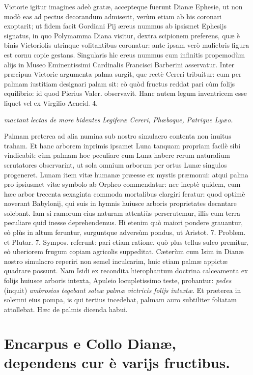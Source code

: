 \documentclass[a4paper, 11pt, oneside, polutonikogreek, latin]{article}
\begin{document}
Victorie igitur imagines adeò gratæ, accepteque fuerunt Dianæ Ephesie, ut non modò eas ad pectus decorandum admiserit, verùm etiam ab his
coronari exoptarit; ut fidem facit Gordiani Pij æreus nummus ab ipsismet Ephesijs signatus, in quo Polymamma Diana visitur, dextra scipionem preferens, quæ è binis Victoriolis utrinque volitantibus coronatur: ante ipsam verò muliebris figura est cornu copie gestans. Singularis hìc ereus nummus cum infinitis propemodùm alijs in Museo Eminentissimi Cardinalis Francisci Barberini asservatur. Inter præcipua Victorie argumenta palma surgit, que rectè Cereri tribuitur: cum per palmam iustitiam designari palam sit: eò quòd fructus reddat pari cùm folijs equilibrio: id quod Pierius Valer. observavit. Hanc autem legum inventricem esse liquet vel ex Virgilio Aeneid. 4.

\emph{mactant lectas de more bidentes}
\emph{Legiferæ Cereri, Phœboque, Patrique Lyæo.}

Palmam preterea ad alia numina sub nostro simulacro contenta non inuitus traham. Et hanc arborem inprimis ipsamet Luna tanquam propriam facilè sibi vindicabit: cùm palmam hoc peculiare cum Luna habere rerum naturalium scrutatores observarint, ut sola omnium arborum per ortus Lunæ singulos progeneret. Lunam item vitæ humanæ præesse ex mystis præmonui: atqui palma pro ipsiusmet vitæ symbolo ab Orpheo commendatur: nec ineptè quidem, cum hæc arbor trecenta sexaginta commoda mortalibus elargiri feratur: quod optimè noverant Babylonij, qui suis in hymnis huiusce arboris proprietates decantare solebant. Iam si ramorum eius naturam attentiùs perscrutemur, illis cum terra peculiare quid inesse deprehendemus. Hi etenim quò maiori pondere grauantur, eò plùs in altum feruntur, surguntque adversùm pondus, ut Aristot. 7. Problem. et Plutar. 7. Sympos. referunt: pari etiam ratione, quò plus tellus sulco premitur, eò uberiorem frugum copiam agricolis suppeditat. Cæterùm cum Isim in Dianæ nostro simulacro reperiri non semel inculcarim, huic etiam palmæ appictæ quadrare possunt. Nam Isidi ex recondita hierophantum doctrina calceamenta ex folijs huiusce arboris intexta, Apuleio locupletissimo teste, probantur: \emph{pedes} (inquit) \emph{ambrosios tegebant soleæ palmæ victricis folijs intextæ}. Et præterea in solemni eius pompa, is qui tertius incedebat, palmam auro subtiliter foliatam attollebat. Hæc de palmis dicenda habui.
\clearpage
\section{Encarpus e Collo Dianæ, dependens cur è varijs fructibus.}
\end{document}
